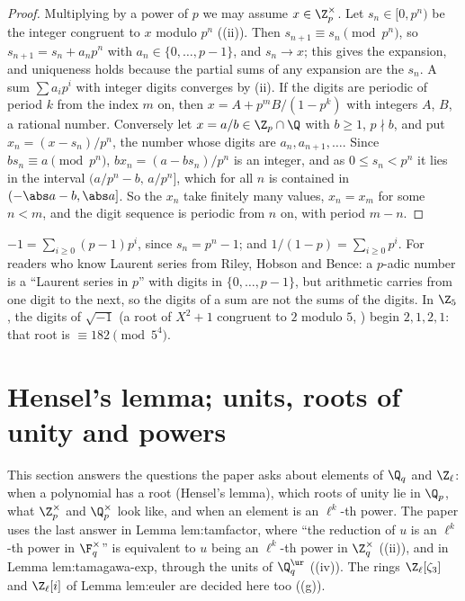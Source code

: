 \begin{proof}
Multiplying by a power of $p$ we may assume $x\in\Z_p^\times$. Let $s_n\in[0,p^n)$ be the integer congruent to $x$ modulo $p^n$
((ii)). Then $s_{n+1}\equiv s_n\pmod{p^n}$, so $s_{n+1}=s_n+a_np^n$ with $a_n\in\{0,\dots,p-1\}$, and $s_n\to x$; this gives
the expansion, and uniqueness holds because the partial sums of any expansion are the $s_n$. A sum $\sum a_ip^i$ with integer digits
converges by (ii).
If the digits are periodic of period $k$ from the index $m$ on, then $x=A+p^mB/(1-p^k)$ with integers $A$, $B$, a rational number.
Conversely let $x=a/b\in\Z_p\cap\Q$ with $b\ge1$, $p\nmid b$, and put $x_n=(x-s_n)/p^n$, the number whose digits are $a_n,a_{n+1},\dots$. Since
$bs_n\equiv a\pmod{p^n}$, $bx_n=(a-bs_n)/p^n$ is an integer, and as $0\le s_n<p^n$ it lies in the interval $(a/p^n-b,\,a/p^n]$, which for all $n$
is contained in $(-\abs a-b,\abs a]$. So the $x_n$ take finitely many values, $x_n=x_m$ for some $n<m$, and the digit sequence is periodic from
$n$ on, with period $m-n$.
\end{proof}

\begin{example}\label{ex:local:expansions}
$-1=\sum_{i\ge0}(p-1)p^i$, since $s_n=p^n-1$; and $1/(1-p)=\sum_{i\ge0}p^i$. For readers who know Laurent series from Riley, Hobson and Bence: a
$p$-adic number is a ``Laurent series in $p$'' with digits in $\{0,\dots,p-1\}$, but arithmetic carries from one digit to the next, so the
digits of a sum are not the sums of the digits. In $\Z_5$, the digits of $\sqrt{-1}$ (a root of $X^2+1$ congruent to $2$ modulo $5$,
) begin $2,1,2,1$: that root is $\equiv182\pmod{5^4}$.
\end{example}

\section{Hensel's lemma; units, roots of unity and powers}\label{sec:local:hensel}

This section answers the questions the paper asks about elements of $\Q_q$ and $\Z_\ell$: when a polynomial has a root
(Hensel's lemma), which roots of unity lie in $\Q_p$, what $\Z_p^\times$ and $\Q_p^\times$ look like, and when an element is an
$\ell^k$-th power. The paper uses the last answer in Lemma lem:tamfactor, where ``the reduction of $u$ is an $\ell^k$-th power in
$\F_q^\times$'' is equivalent to $u$ being an $\ell^k$-th power in $\Z_q^\times$ ((ii)), and in Lemma
lem:tamagawa-exp, through the units of $\Q_q^{\ur}$ ((iv)). The rings $\Z_\ell[\zeta_3]$ and $\Z_\ell[i]$ of Lemma
lem:euler are decided here too ((g)).

